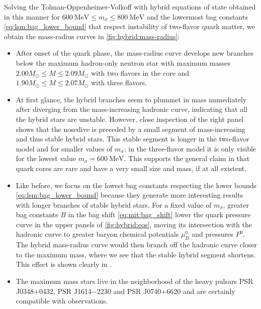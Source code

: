 Solving the Tolman-Oppenheimer-Volkoff with hybrid equations of state obtained in this manner
for $\SI{600}{\mega\electronvolt} \leq m_\sigma \leq \SI{800}{\mega\electronvolt}$ and the lowermost bag constants \eqref{eq:lsm:bag_lower_bound} that respect instability of two-flavor quark matter,
we obtain the mass-radius curves in \cref{fig:hybrid:mass-radius}:
\begin{itemize}
\item After onset of the quark phase, the mass-radius curve develops new branches below the maximum hadron-only neutron star
      with maximum masses $2.00 M_\odot \leq M \leq 2.09 M_\odot$ with two flavors in the core
      and $1.90 M_\odot \leq M \leq 2.07 M_\odot$ with three flavors.
\item At first glance, the hybrid branches seem to plummet in mass immediately after diverging from the mass-increasing hadronic curve,
      indicating that all the hybrid stars are unstable.
      However, close inspection of the right panel shows that the nosedive is preceded by a small segment of mass-increasing and thus stable hybrid stars.
      This stable segment is longer in the two-flavor model and for smaller values of $m_\sigma$;
      in the three-flavor model it is only visible for the lowest value $m_\sigma = \SI{600}{\mega\electronvolt}$.
      This supports the general claim in \cite{ref:quark_star_review} that quark cores are rare and have a very small size and mass, if at all existent.
\item Like before, we focus on the lowest bag constants respecting the lower bounds \eqref{eq:lsm:bag_lower_bound}
      because they generate more interesting results with longer branches of stable hybrid stars.
      For a fixed value of $m_\sigma$,
      greater bag constants $B$ in the bag shift \eqref{eq:mit:bag_shift} lower the quark pressure curve in the upper panels of \cref{fig:hybrid:eos},
      moving its intersection with the hadronic curve to greater baryon chemical potentials $\mu_B^0$ and pressures $P^0$.
      The hybrid mass-radius curve would then branch off the hadronic curve closer to the maximum mass,
      where we see that the stable hybrid segment shortens.
      This effect is shown clearly in \cite[figure 14]{ref:lsm3f_hybrid_stars}.
\item The maximum mass stars live in the neighborhood of the heavy pulsars PSR J0348$+$0432, PSR J1614$-$2230 and PSR J0740$+$6620 and are certainly compatible with observations.
\end{itemize}

